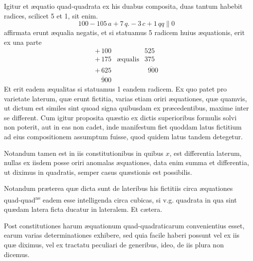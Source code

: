 \documentclass[11pt,a4paper]{article}
\begin{document}
Igitur et æquatio quad-quadrata ex his duabus composita, duas tantum habebit radices, scilicet 5 et 1, sit enim.
\[ 100 - 105\,a + 7\,q. - 3\,c + 1\,qq \parallel 0 \]
affirmata erunt æqualia negatis, et si statuamus 5 radicem huius æquationis, erit ex una parte
\[
\begin{array}{rcr}
+\,100 & & 525\\
+\,175 & \text{æqualis} & 375\\
+\,625 & & \overline{\phantom{0}900}\\[-2pt]
\overline{\phantom{+\,}900} & &
\end{array}
\]
Et erit eadem æqualitas si statuamus 1 eandem radicem. Ex quo patet pro varietate laterum, quæ erunt fictitia, varias etiam oriri æquationes, quæ quamvis, ut dictum est similes sint quoad signa quibusdam ex præcedentibus, maxime inter se different. Cum igitur proposita quæstio ex dictis superioribus formulis solvi non poterit, aut in eas non cadet, inde manifestum fiet quoddam latus fictitium ad eius compositionem assumptum fuisse, quod quidem latus tandem detegetur.

Notandum tamen est in iis constitutionibus in quibus $x$, est differentia laterum, nullas ex iisdem posse oriri anomalas æquationes, data enim summa et differentia, ut diximus in quadratis, semper casus quæstionis est possibilis.

Notandum præterea quæ dicta sunt de lateribus his fictitiis circa æquationes quad-quad\textsuperscript{as} eadem esse intelligenda circa cubicas, si v.g. quadrata in qua sint quædam latera ficta ducatur in lateralem. Et cætera.

Post constitutiones harum æquationum quad-quadraticarum convenientius esset, earum varias determinationes exhibere, sed quia facile haberi possunt vel ex iis quæ diximus, vel ex tractatu peculiari de generibus, ideo, de iis plura non dicemus.

\end{document}
